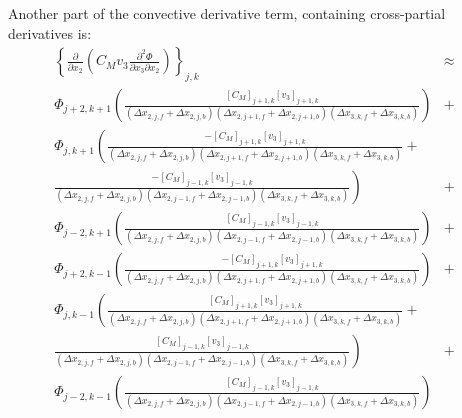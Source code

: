 \documentclass[11pt,letterpaper]{article}
\begin{document}
Another part of the convective derivative term, containing cross-partial derivatives is:  
\begin{eqnarray}
\left\{ \frac{\partial}{\partial x_2} \left( C_M v_3 \frac{\partial^2 \Phi }{\partial x_3 \partial x_2} \right) \right\}_{j,k} &\approx& \nonumber \\
\Phi_{j+2,k+1} \left( \frac{[C_M]_{j+1,k} [v_3]_{j+1,k} }{ \left( \Delta x_{2,j,f}+\Delta x_{2,j,b} \right) \left( \Delta x_{2,j+1,f}+\Delta x_{2,j+1,b} \right) \left( \Delta x_{3,k,f}+\Delta x_{3,k,b} \right) } \right) &+& \nonumber \\
\Phi_{j,k+1} \left( \frac{-[C_M]_{j+1,k} [v_3]_{j+1,k} }{ \left( \Delta x_{2,j,f}+\Delta x_{2,j,b} \right) \left( \Delta x_{2,j+1,f}+\Delta x_{2,j+1,b} \right) \left( \Delta x_{3,k,f}+\Delta x_{3,k,b} \right) } \right. + &~& \nonumber \\
\left. \frac{-[C_M]_{j-1,k} [v_3]_{j-1,k} }{ \left( \Delta x_{2,j,f}+\Delta x_{2,j,b} \right) \left( \Delta x_{2,j-1,f}+\Delta x_{2,j-1,b} \right) \left( \Delta x_{3,k,f}+\Delta x_{3,k,b} \right) } \right) &+& \nonumber \\
\Phi_{j-2,k+1} \left( \frac{[C_M]_{j-1,k} [v_3]_{j-1,k} }{ \left( \Delta x_{2,j,f}+\Delta x_{2,j,b} \right) \left( \Delta x_{2,j-1,f}+\Delta x_{2,j-1,b} \right) \left( \Delta x_{3,k,f}+\Delta x_{3,k,b} \right) } \right) &+& \nonumber \\
\Phi_{j+2,k-1} \left( \frac{-[C_M]_{j+1,k} [v_3]_{j+1,k} }{ \left( \Delta x_{2,j,f}+\Delta x_{2,j,b} \right) \left( \Delta x_{2,j+1,f}+\Delta x_{2,j+1,b} \right) \left( \Delta x_{3,k,f}+\Delta x_{3,k,b} \right) } \right) &+& \nonumber \\
\Phi_{j,k-1} \left( \frac{[C_M]_{j+1,k} [v_3]_{j+1,k} }{ \left( \Delta x_{2,j,f}+\Delta x_{2,j,b} \right) \left( \Delta x_{2,j+1,f}+\Delta x_{2,j+1,b} \right) \left( \Delta x_{3,k,f}+\Delta x_{3,k,b} \right) } \right. + &~& \nonumber \\
\left. \frac{[C_M]_{j-1,k} [v_3]_{j-1,k} }{ \left( \Delta x_{2,j,f}+\Delta x_{2,j,b} \right) \left( \Delta x_{2,j-1,f}+\Delta x_{2,j-1,b} \right) \left( \Delta x_{3,k,f}+\Delta x_{3,k,b} \right) } \right) &+& \nonumber \\
\Phi_{j-2,k-1} \left( \frac{[C_M]_{j-1,k} [v_3]_{j-1,k} }{ \left( \Delta x_{2,j,f}+\Delta x_{2,j,b} \right) \left( \Delta x_{2,j-1,f}+\Delta x_{2,j-1,b} \right) \left( \Delta x_{3,k,f}+\Delta x_{3,k,b} \right) } \right) 
\end{eqnarray}
\end{document}
